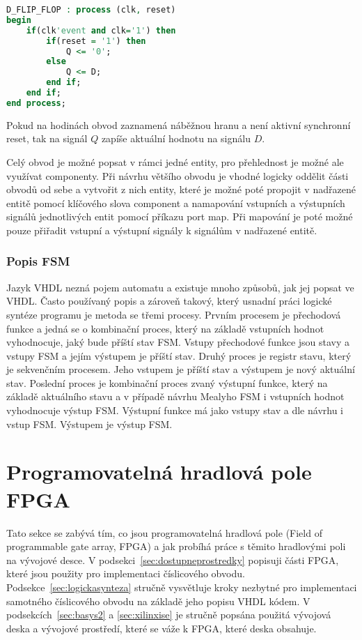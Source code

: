 \documentclass{report}
\begin{document}
\begin{lstlisting}[language=VHDL]
D_FLIP_FLOP : process (clk, reset)
begin
	if(clk'event and clk='1') then       
		if(reset = '1') then
			Q <= '0';
		else 
			Q <= D;
		end if;
	end if;
end process;
\end{lstlisting}
Pokud na hodinách obvod zaznamená náběžnou hranu a není aktivní synchronní reset, tak na signál $Q$ zapíše aktuální hodnotu na signálu $D$. \par
Celý obvod je možné popsat v rámci jedné entity, pro přehlednost je možné ale využívat componenty. Při návrhu většího obvodu je vhodné logicky oddělit části obvodů od sebe a vytvořit z nich entity, které je možné poté propojit v nadřazené entitě pomocí klíčového slova component a namapování vstupních a výstupních signálů jednotlivých entit pomocí příkazu port map. Při mapování je poté možné pouze přiřadit vstupní a výstupní signály k signálům v nadřazené entitě.  
\subsubsection{Popis FSM}
Jazyk VHDL nezná pojem automatu a existuje mnoho způsobů, jak jej popsat ve VHDL. Často používaný popis a zároveň takový, který usnadní práci logické syntéze programu je metoda se třemi procesy. Prvním procesem je přechodová funkce a jedná se o kombinační proces, který na základě vstupních hodnot vyhodnocuje, jaký bude příští stav FSM. Vstupy přechodové funkce jsou stavy a vstupy FSM a jejím výstupem je příští stav. Druhý proces je registr stavu, který je sekvenčním procesem. Jeho vstupem je příští stav a výstupem je nový aktuální stav. Poslední proces je kombinační proces zvaný výstupní funkce, který na základě aktuálního stavu a v případě návrhu Mealyho FSM i vstupních hodnot vyhodnocuje výstup FSM. Výstupní funkce má jako vstupy stav a dle návrhu i vstup FSM. Výstupem je výstup FSM.

\section{Programovatelná hradlová pole FPGA}\label{sec:fpga}
Tato sekce se zabývá tím, co jsou programovatelná hradlová pole (Field of programmable gate array, FPGA) a jak probíhá práce s těmito hradlovými poli na vývojové desce. V podsekci~\ref{sec:dostupneprostredky} popisuji části FPGA, které jsou použity pro implementaci číslicového obvodu. Podsekce~\ref{sec:logickasynteza} stručně vysvětluje kroky nezbytné pro implementaci samotného číslicového obvodu na základě jeho popisu VHDL kódem. V podsekcích~\ref{sec:basys2} a \ref{sec:xilinxise} je stručně popsána použitá vývojová deska a vývojové prostředí, které se váže k FPGA, které deska obsahuje.
\end{document}
